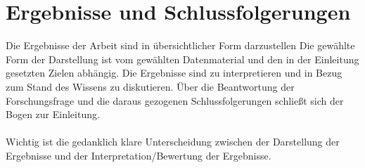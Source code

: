 \chapter{Ergebnisse und Schlussfolgerungen}
Die Ergebnisse der Arbeit sind in übersichtlicher Form darzustellen Die gewählte Form der Darstellung ist vom gewählten Datenmaterial und den in der Einleitung gesetzten Zielen abhängig. Die Ergebnisse sind zu interpretieren und in Bezug zum Stand des Wissens zu diskutieren. Über die Beantwortung der Forschungsfrage und die daraus gezogenen Schlussfolgerungen schließt sich der Bogen zur Einleitung.
\\
\\Wichtig ist die gedanklich klare Unterscheidung zwischen der Darstellung der Ergebnisse und der Interpretation/Bewertung der Ergebnisse.
